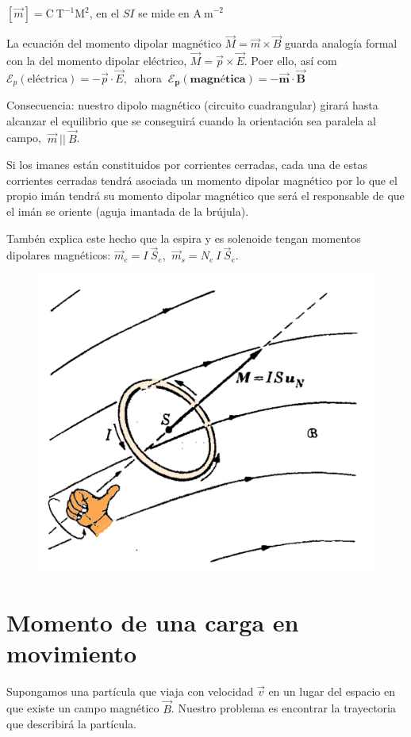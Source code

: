 $[\vec m]=\mathrm{C\ T}^{-1} \mathrm{M}^2$, en el $SI$ se mide en $\mathrm{A\ m}^{-2}$

La ecuación del momento dipolar magnético $\vec M=\vec m \times \vec B$ guarda analogía formal con la del momento dipolar eléctrico, $\vec M=\vec p \times \vec E$. Poer ello, así com $\mathcal E_p (\text{eléctrica}) = - \vec p \cdot \vec E,\ $ ahora $\ \boldsymbol{\mathcal E_p(\text{magnética})=-\vec m \cdot \vec B}$

\begin{miparrafodestacado}
Consecuencia: nuestro dipolo magnético (circuito cuadrangular) girará hasta alcanzar el equilibrio que se conseguirá cuando  la orientación sea paralela al campo, $\ \vec m \ || \ \vec B$.	
\end{miparrafodestacado}


\begin{multicols}{2}
Si los imanes están constituidos por corrientes cerradas, cada una de estas corrientes cerradas tendrá asociada un momento dipolar magnético por lo que el propio imán tendrá su momento dipolar magnético que será el responsable de que el imán se oriente (aguja imantada de la brújula).

Tambén explica este hecho que la espira y es solenoide tengan momentos dipolares magnéticos: $\vec m_e=I\ \vec S_e$, $\ \vec m_s=N_e \ I\ \vec S_e$.
\begin{figure}[H]
	\centering
	\includegraphics[width=.4\textwidth]{imagenes/imagenes26/T26IM16.png}
	\end{figure}
\end{multicols}

\section{Momento de una carga en movimiento}

Supongamos una partícula que viaja con velocidad $\vec v$ en un lugar del espacio en que existe un campo magnético $\vec B$. Nuestro problema es encontrar la trayectoria que describirá la partícula.

